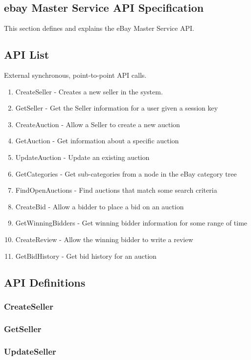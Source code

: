 \documentclass[12pt,a4paper]{article}
\begin{document}
\subsection{ebay Master Service API Specification}
This section defines and explains the eBay Master Service API.


\subsection{API List}
External synchronous, point-to-point API calls.

\begin{enumerate}
	\item CreateSeller - Creates a new seller in the system.
	\item GetSeller - Get the Seller information for a user given a session key
	\item CreateAuction - Allow a Seller to create a new auction
	\item GetAuction - Get information about a specific auction
	\item UpdateAuction - Update an existing auction
	\item GetCategories - Get sub-categories from a node in the eBay category tree
	\item FindOpenAuctions - Find auctions that match some search criteria
	\item CreateBid - Allow a bidder to place a bid on an auction
	\item GetWinningBidders - Get winning bidder information for some range of time
	\item CreateReview - Allow the winning bidder to write a review
	\item GetBidHistory - Get bid history for an auction
\end{enumerate}


\subsection{API Definitions}
\subsubsection{CreateSeller}
\subsubsection{GetSeller}
\subsubsection{UpdateSeller}
\end{document}
